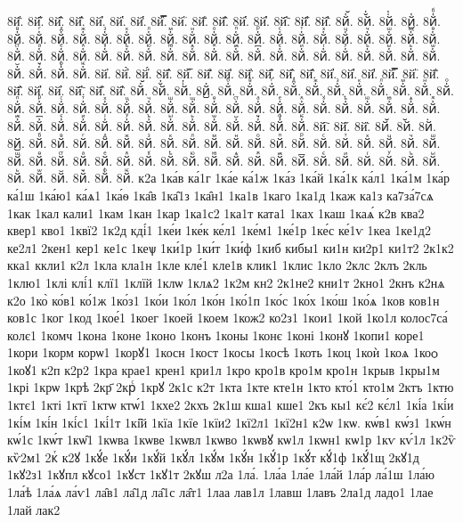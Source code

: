 {8й҅̈.
8й҅̋.
8й҅̏.
8й҅̑.
8й҅̓.
8й҅̔.
8й҅̾.
8й҅̿.
8й҅͘.
8й҅҃.
8й҅҄.
8й҅҅.
8й҅҆.
8й҅҇.
8й҅᷀.
8й҅᷁.
8й҅᷶.
8й᷷҅.
8й᷸҅.
8й᷹҅.
8й҅ⷠ.
8й҅ⷡ.
8й҅ⷢ.
8й҅ⷣ.
8й҅ⷤ.
8й҅ⷥ.
8й҅ⷦ.
8й҅ⷧ.
8й҅ⷨ.
8й҅ⷩ.
8й҅ⷪ.
8й҅ⷫ.
8й҅ⷬ.
8й҅ⷭ.
8й҅ⷮ.
8й҅ⷯ.
8й҅ⷰ.
8й҅ⷱ.
8й҅ⷲ.
8й҅ⷳ.
8й҅ⷴ.
8й҅ⷵ.
8й҅ⷶ.
8й҅ⷷ.
8й҅ⷸ.
8й҅ⷹ.
8й҅ⷺ.
8й҅ⷻ.
8й҅ⷼ.
8й҅ⷽ.
8й҅ⷾ.
8й҅ⷿ.
8й҅꙯.
8й҅ꙴ.
8й҅ꙵ.
8й҅ꙶ.
8й҅ꙷ.
8й҅ꙸ.
8й҅ꙹ.
8й҅ꙺ.
8й҅ꙻ.
8й҅꙼.
8й҅꙽.
8й҅ꚞ.
8й҅ꚟ.
8й҆.
8й҆̀.
8й҆́.
8й҆̂.
8й҆̅.
8й҆̆.
8й҆̇.
8й҆̈.
8й҆̋.
8й҆̏.
8й҆̑.
8й҆̓.
8й҆̔.
8й҆̾.
8й҆̿.
8й҆͘.
8й҆҃.
8й҆҄.
8й҆҅.
8й҆҆.
8й҆҇.
8й҆᷀.
8й҆᷁.
8й҆᷶.
8й᷷҆.
8й᷸҆.
8й᷹҆.
8й҆ⷠ.
8й҆ⷡ.
8й҆ⷢ.
8й҆ⷣ.
8й҆ⷤ.
8й҆ⷥ.
8й҆ⷦ.
8й҆ⷧ.
8й҆ⷨ.
8й҆ⷩ.
8й҆ⷪ.
8й҆ⷫ.
8й҆ⷬ.
8й҆ⷭ.
8й҆ⷮ.
8й҆ⷯ.
8й҆ⷰ.
8й҆ⷱ.
8й҆ⷲ.
8й҆ⷳ.
8й҆ⷴ.
8й҆ⷵ.
8й҆ⷶ.
8й҆ⷷ.
8й҆ⷸ.
8й҆ⷹ.
8й҆ⷺ.
8й҆ⷻ.
8й҆ⷼ.
8й҆ⷽ.
8й҆ⷾ.
8й҆ⷿ.
8й҆꙯.
8й҆ꙴ.
8й҆ꙵ.
8й҆ꙶ.
8й҆ꙷ.
8й҆ꙸ.
8й҆ꙹ.
8й҆ꙺ.
8й҆ꙻ.
8й҆꙼.
8й҆꙽.
8й҆ꚞ.
8й҆ꚟ.
8й҇.
8й᷀.
8й᷁.
8й᷶.
8й᷷.
8й᷸.
8й᷹.
8йⷠ.
8йⷡ.
8йⷢ.
8йⷣ.
8йⷤ.
8йⷥ.
8йⷦ.
8йⷧ.
8йⷨ.
8йⷩ.
8йⷪ.
8йⷫ.
8йⷬ.
8йⷭ.
8йⷮ.
8йⷯ.
8йⷰ.
8йⷱ.
8йⷲ.
8йⷳ.
8йⷴ.
8йⷵ.
8йⷶ.
8йⷷ.
8йⷸ.
8йⷹ.
8йⷺ.
8йⷻ.
8йⷼ.
8йⷽ.
8йⷾ.
8йⷿ.
8й꙯.
8йꙴ.
8йꙵ.
8йꙶ.
8йꙷ.
8йꙸ.
8йꙹ.
8йꙺ.
8йꙻ.
8й꙼.
8й꙽.
8йꚞ.
8йꚟ.
к2а
1ка́в
ка́1г
1ка́е
ка́1ж
1ка́з
1ка́й
1ка́1к
ка́л1
1ка́1м
1ка́р
ка́1ш
1ка́ю1
ка́ѧ1
1ка́ѳ
1ка̑в
1ка̑1з
1ка̑н1
1ка1в
1каго
1ка1д
1каж
ка1з
ка7за́7сѧ
1как
1кал
кали1
1кам
1кан
1кар
1ка1с2
1ка1т
ката1
1ках
1каш
1каѧ́
к2в
ква2
квер1
кво1
1квї2
1к2д
кді́1
1ке́и
1ке́к
ке́л1
1ке́м1
1ке́1р
1ке́с
ке́1ѵ
1кеа
1ке1д2
ке2л1
2кен1
кер1
ке1с
1кеѱ
1ки́1р
1ки́т
1ки́ф
1киб
кибы1
ки1н
ки2р1
ки1т2
2к1к2
кка1
ккли1
к2л
1кла
кла1н
1кле
кле́1
кле1в
клик1
1клис
1кло
2клс
2клъ
2кль
1клю1
1клі
клі́1
клї1
1клїй
1клѡ
1клѧ2
1к2м
кн2
2к1не2
кни1т
2кно1
2кнъ
к2нѧ
к2о
1ко̀
ко́в1
ко́1ж
1ко́з1
1ко́и
1ко́л
1ко́н
1ко́1п
1ко́с
1ко́х
1ко́ш
1ко́ѧ
1ков
ков1н
ков1с
1ког
1код
1кое́1
1коег
1коей
1коем
1кож2
ко2з1
1кои1
1кой
1ко1л
колос7са́
колє1
1комч
1кона
1коне
1коно
1конъ
1коны
1конє
1коні
1конꙋ
1копи1
коре1
1кори
1корм
корѡ1
1корꙋ1
1косн
1кост
1косы
1косѣ
1коть
1коц
1коѝ
1коѧ
1коѻ
1коꙋ1
к2п
к2р2
1кра
крае1
крен1
кри1л
1кро
кро1в
кро1м
кро1н
1крыв
1кры1м
1крі
1крѡ
1крѣ
2кр҃
2крⷭ
1крꙋ
2к1с
к2т
1кта
1кте
кте1н
1кто
кто́1
кто1м
2ктъ
1ктю
1ктє1
1кті
1ктї
1ктѡ
ктѡ́1
1кхе2
2кхъ
2к1ш
кша1
кше1
2къ
кы1
кє́2
кє́л1
1кі́а
1кі́и
1кі́м
1кі́н
1кі́с1
1кі́1т
1кі̑й
1кїа
1кїе
1кїи2
1кї2л1
1кї2н1
к2ѡ
1кѡ.
кѡ́в1
кѡ́з1
1кѡ́н
кѡ́1с
1кѡ́т
1кѡ̑1
1кѡва
1кѡве
1кѡвл
1кѡво
1кѡвꙋ
кѡ1л
1кѡн1
кѡ1р
1кѵ
кѵ́1л
1к2ѷ
кѷ2м1
2кⷮ
к2ꙋ
1кꙋ́е
1кꙋ́и
1кꙋ́й
1кꙋ́л
1кꙋ́м
1кꙋ́н
1кꙋ́1р
1кꙋ́т
кꙋ́1ф
1кꙋ́1щ
2кꙋ1д
1кꙋ2з1
1кꙋпл
кꙋсо1
1кꙋст
1кꙋ1т
2кꙋш
л2а
1ла́.
1ла́а
1ла́е
1ла́й
1ла́р
ла́1ш
1ла́ю
1ла́ѣ
1ла́ѧ
ла́ѵ1
ла̑в1
ла̑1д
ла̑1с
ла̑т1
1лаа
лав1л
1лавш
1лавъ
2ла1д
ладо1
1лае
1лай
лак2
}
